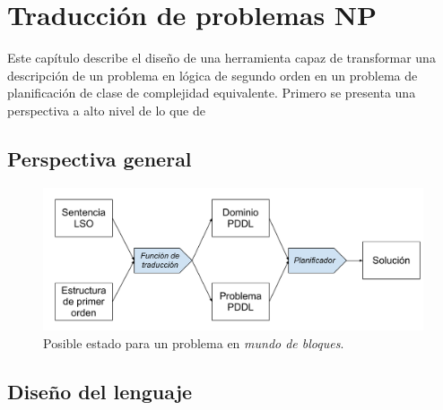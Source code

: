 
\chapter{Traducción de problemas NP}
\label{Chapter2}
Este capítulo describe el diseño de una herramienta capaz de transformar una
descripción de un problema en lógica de segundo orden 
en un problema de planificación de clase de complejidad equivalente. 
Primero se presenta una perspectiva a alto nivel de lo que de

\section{Perspectiva general}
\begin{figure}[h!]
\centering
\includegraphics[width=\textwidth]{figuras/esquema_herramienta.pdf}
\caption{Posible estado para un problema en \textit{mundo de bloques}.}
\label{esquema_herramienta}
\end{figure}

\section{Diseño del lenguaje}


